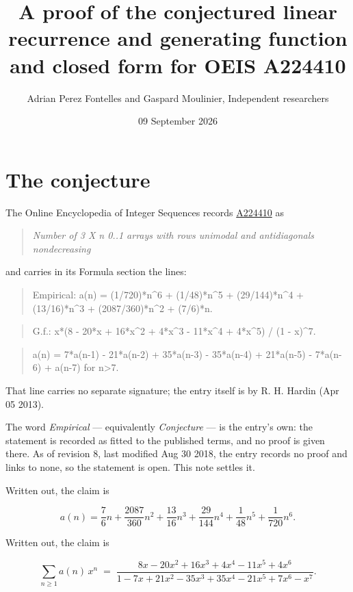 \documentclass[11pt]{article}
\title{A proof of the conjectured linear recurrence and generating function and closed form for OEIS A224410}
\author{Adrian Perez Fontelles and Gaspard Moulinier, Independent researchers}
\date{09 September 2026}
\theoremstyle{definition}
\begin{document}
\maketitle
\section{The conjecture}

The Online Encyclopedia of Integer Sequences records \href{https://oeis.org/A224410}{A224410} as

\begin{quote}\itshape Number of 3 X n 0..1 arrays with rows unimodal and antidiagonals nondecreasing\end{quote}

and carries in its Formula section the lines:

\begin{quote}\ttfamily Empirical: a(n) = (1/720)*n\textasciicircum{}6 + (1/48)*n\textasciicircum{}5 + (29/144)*n\textasciicircum{}4 + (13/16)*n\textasciicircum{}3 + (2087/360)*n\textasciicircum{}2 + (7/6)*n.\end{quote}

\begin{quote}\ttfamily G.f.: x*(8 - 20*x + 16*x\textasciicircum{}2 + 4*x\textasciicircum{}3 - 11*x\textasciicircum{}4 + 4*x\textasciicircum{}5) / (1 - x)\textasciicircum{}7.\end{quote}

\begin{quote}\ttfamily a(n) = 7*a(n-1) - 21*a(n-2) + 35*a(n-3) - 35*a(n-4) + 21*a(n-5) - 7*a(n-6) + a(n-7) for n>7.\end{quote}

That line carries no separate signature; the entry itself is by R. H. Hardin (Apr 05 2013).

The word {\itshape Empirical} --- equivalently {\itshape Conjecture} --- is the entry's own: the statement is recorded as fitted to the published terms, and no proof is given there. As of revision 8, last modified Aug 30 2018, the entry records no proof and links to none, so the statement is open. This note settles it.

Written out, the claim is

\[a(n) = \frac{7}{6}n + \frac{2087}{360}n^{2} + \frac{13}{16}n^{3} + \frac{29}{144}n^{4} + \frac{1}{48}n^{5} + \frac{1}{720}n^{6}.\]

Written out, the claim is

\[\sum_{n \ge 1} a(n)\,x^n \;=\; \frac{8x - 20x^{2} + 16x^{3} + 4x^{4} - 11x^{5} + 4x^{6}}{1 - 7x + 21x^{2} - 35x^{3} + 35x^{4} - 21x^{5} + 7x^{6} - x^{7}}.\]
\end{document}
